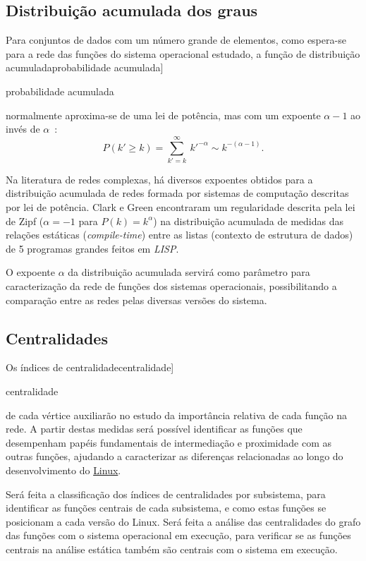 \documentclass[a4paper,12pt,twoside]{article}
\def\linux{\href{http://www.kernel.org/}{\sc Linux}}
\renewcommand\marginpar[1]{}
\let\oldmarginpar\marginpar
\renewcommand\marginpar[1]{\-\oldmarginpar[\raggedleft\footnotesize #1]%
{\raggedright\footnotesize #1}}
\begin{document}
\subsection{Distribuição acumulada dos graus}

Para conjuntos de dados com um número grande de elementos, como
espera-se para a rede das funções do sistema operacional estudado,
a função de distribuição acumulada\marginpar{probabilidade
  acumulada} normalmente aproxima-se de uma lei de potência, mas com
um expoente $\alpha-1$ ao invés de $\alpha$~\cite{newman-2003-45}:
\begin{displaymath}
  \label{eq:power}
  P(k'\geq k)=\sum_{k'=k}^{\infty}\ k'^{-\alpha} \sim k^{-(\alpha-1)}.
\end{displaymath}

Na literatura de redes complexas, há diversos expoentes obtidos para a
distribuição acumulada de redes formada por sistemas de computação
descritas por lei de potência. Clark e Green encontraram um
regularidade descrita pela lei de Zipf ($\alpha=-1$ para
$P(k)=k^\alpha$) na distribuição acumulada de medidas das relações
estáticas ({\em compile-time\/}) entre as listas (contexto de
estrutura de dados) de 5 programas grandes feitos em {\em LISP}.

O expoente $\alpha$ da distribuição acumulada servirá como parâmetro
para caracterização da rede de funções dos sistemas operacionais,
possibilitando a comparação entre as redes pelas diversas versões do
sistema.
 
\subsection{Centralidades}

Os índices de centralidade\marginpar{centralidade} de cada vértice
auxiliarão no estudo da importância relativa de cada função na rede. A
partir destas medidas será possível identificar as funções que desempenham 
papéis fundamentais de intermediação e proximidade com as outras funções,
ajudando a caracterizar as diferenças relacionadas ao longo do
desenvolvimento do \linux.

Será feita a classificação dos índices de centralidades por
subsistema, para identificar as funções centrais de cada subsistema, e
como estas funções se posicionam a cada versão do Linux. Será feita a
análise das centralidades do grafo das funções com o sistema
operacional em execução, para verificar se as funções centrais na
análise estática também são centrais com o sistema em execução.
\end{document}
